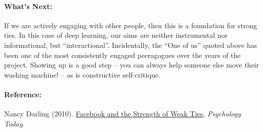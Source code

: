 \paragraph{What's Next:} If we are actively engaging with other people,
then this is a foundation for strong ties. In this case of deep
learning, our aims are neither instrumental nor informational, but
``interactional''. Incidentally, the ``One of us'' quoted above has been
one of the most consistently engaged peeragogues over the years of the
project. Showing up is a good step -- you can always help someone else
move their washing machine! -- as is constructive self-critique.

\paragraph{Reference:}

Nancy Darling (2010).
\href{http://www.psychologytoday.com/blog/thinking-about-kids/201005/facebook-and-the-strength-weak-ties}{Facebook
and the Strength of Weak Ties}, \emph{Psychology Today}.
